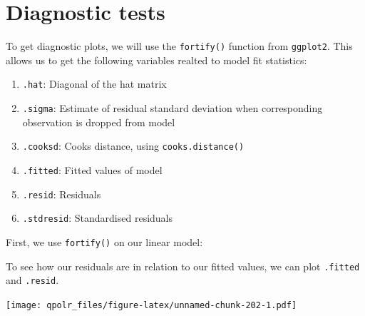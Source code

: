 \documentclass[12pt,oneside]{reedthesis}
\providecommand{\tightlist}{%
  \setlength{\itemsep}{0pt}\setlength{\parskip}{0pt}}
\theoremstyle{definition}
\theoremstyle{definition}
\theoremstyle{definition}
\theoremstyle{remark}
\begin{document}
  \section{Diagnostic tests}\label{diagnostic-tests}
  
  To get diagnostic plots, we will use the \texttt{fortify()} function
  from \texttt{ggplot2}. This allows us to get the following variables
  realted to model fit statistics:
  \begin{enumerate}
  \def\labelenumi{\arabic{enumi}.}
  \tightlist
  \item
    \texttt{.hat}: Diagonal of the hat matrix
  \item
    \texttt{.sigma}: Estimate of residual standard deviation when
    corresponding observation is dropped from model
  \item
    \texttt{.cooksd}: Cooks distance, using \texttt{cooks.distance()}
  \item
    \texttt{.fitted}: Fitted values of model
  \item
    \texttt{.resid}: Residuals
  \item
    \texttt{.stdresid}: Standardised residuals
  \end{enumerate}
  First, we use \texttt{fortify()} on our linear model:
  \begin{Shaded}
  \begin{Highlighting}[]
  \StringTok{ }
  \end{Highlighting}
  \end{Shaded}
  To see how our residuals are in relation to our fitted values, we can
  plot \texttt{.fitted} and \texttt{.resid}.
  \begin{Shaded}
  \begin{Highlighting}[]
  \NormalTok{(}\OperatorTok{+}
  \StringTok{  }\NormalTok{() }\OperatorTok{+}
  \StringTok{  }\NormalTok{(} \NormalTok{) }\OperatorTok{+}
  \StringTok{  }\NormalTok{(} \NormalTok{) }\OperatorTok{+}
  \StringTok{  }\NormalTok{(} \NormalTok{,}
          \NormalTok{,}
          \NormalTok{)}
  \end{Highlighting}
  \end{Shaded}
  \texttt{[image: qpolr\_files/figure-latex/unnamed-chunk-202-1.pdf]}
  
\end{document}
